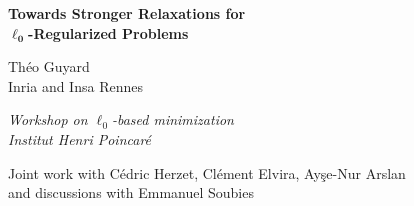 \documentclass[10pt]{beamer}
\begin{document}
\begin{frame}
  \begin{center}
    {\large\textbf{Towards Stronger Relaxations for \\ $\boldsymbol{\ell}_{\boldsymbol{0}}$-Regularized Problems}}
  \end{center}
  \begin{center}
    Théo Guyard \\
    Inria and Insa Rennes
  \end{center}
  \begin{center}
    \textit{Workshop on $\ell_0$-based minimization} \\
    \textit{Institut Henri Poincaré}
  \end{center}
  \vfill
  \begin{center}
    \small{Joint work with Cédric Herzet, Clément Elvira, Ay\c{s}e-Nur Arslan} \\ \small{and discussions with Emmanuel Soubies}
  \end{center}
\end{frame}
\end{document}

